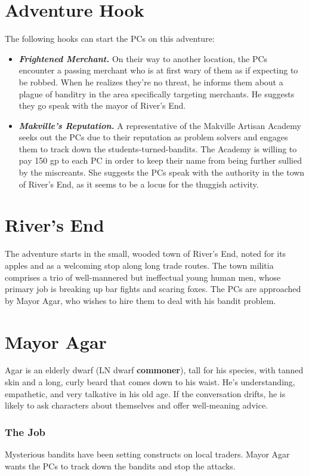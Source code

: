 \documentclass[10pt,a4paper,twoside,bg=print,twocolumn,openany,nodeprecatedcode]{dndbook}
\begin{document}
\section{Adventure Hook}
The following hooks can start the PCs on this adventure:


\begin{itemize}
\item \textbf{\textit{Frightened Merchant.}} On their way to another location, the PCs encounter a passing merchant who is at first wary of them as if expecting to be robbed. When he realizes they're no threat, he informs them about a plague of banditry in the area specifically targeting merchants. He suggests they go speak with the mayor of River's End.
\item \textbf{\textit{Makville's Reputation.}} A representative of the Makville Artisan Academy seeks out the PCs due to their reputation as problem solvers and engages them to track down the students-turned-bandits. The Academy is willing to pay 150 gp to each PC in order to keep their name from being further sullied by the miscreants. She suggests the PCs speak with the authority in the town of River's End, as it seems to be a locus for the thuggish activity.
\end{itemize}

\section{River's End}
The adventure starts in the small, wooded town of River's End, noted for its apples and as a welcoming stop along long trade routes. The town militia comprises a trio of well-mannered but ineffectual young human men, whose primary job is breaking up bar fights and scaring foxes. The PCs are approached by Mayor Agar, who wishes to hire them to deal with his bandit problem.

\section{Mayor Agar}
Agar is an elderly dwarf (LN dwarf \textbf{commoner}), tall for his species, with tanned skin and a long, curly beard that comes down to his waist. He's understanding, empathetic, and very talkative in his old age. If the conversation drifts, he is likely to ask characters about themselves and offer well-meaning advice.

\subsubsection{The Job}
Mysterious bandits have been setting constructs on local traders. Mayor Agar wants the PCs to track down the bandits and stop the attacks.
\end{document}
